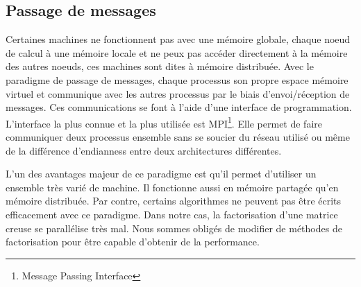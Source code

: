\subsection{Passage de messages}
Certaines machines ne fonctionnent pas avec une mémoire globale, chaque noeud de calcul à une mémoire locale et ne peux pas accéder directement à la mémoire des autres noeuds, ces machines sont dites à mémoire distribuée.
%
Avec le paradigme de passage de messages, chaque processus son propre espace mémoire virtuel et communique avec les autres processus par le biais d'envoi/réception de messages.
%
Ces communications se font à l'aide d'une interface de programmation.
%
L'interface la plus connue et la plus utilisée est MPI\footnote{Message Passing Interface}.
%
Elle permet de faire communiquer deux processus ensemble sans se soucier du réseau utilisé ou même de la différence d'endianness entre deux architectures différentes.


L'un des avantages majeur de ce paradigme est qu'il permet d'utiliser un ensemble très varié de machine.
%
Il fonctionne aussi en mémoire partagée qu'en mémoire distribuée.
%
Par contre, certains algorithmes ne peuvent pas être écrits efficacement avec ce paradigme.
%
Dans notre cas, la factorisation d'une matrice creuse se parallélise très mal.
%
Nous sommes obligés de modifier de méthodes de factorisation pour être capable d'obtenir de la performance.
